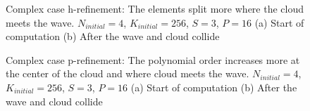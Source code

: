 \begin{figure}[H]
	\centering
	\hfill
	\caption{Complex case h-refinement: The elements split more where the cloud meets the wave. \(N_{initial} = 4\), \(K_{initial} = 256\), \(S = 3\), \(P = 16\) (a) Start of computation (b) After the wave and cloud collide}\label{fig:cloud_s}
\end{figure}

\begin{figure}[H]
	\centering
	\hfill
	\caption{Complex case p-refinement: The polynomial order increases more at the center of the cloud and where cloud meets the wave. \(N_{initial} = 4\), \(K_{initial} = 256\), \(S = 3\), \(P = 16\) (a) Start of computation (b) After the wave and cloud collide}\label{fig:cloud_N}
\end{figure}

